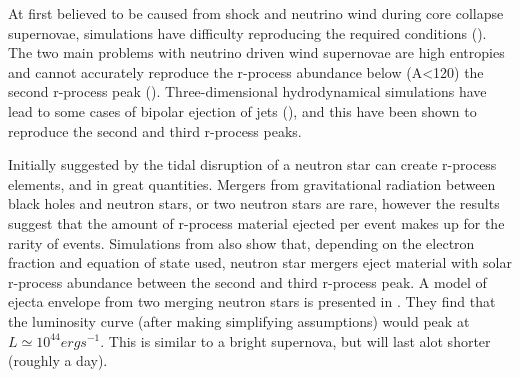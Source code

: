 At first believed to be caused from shock and neutrino wind during core collapse supernovae, simulations have difficulty reproducing the required conditions ().
The two main problems with neutrino driven wind supernovae are high entropies and cannot accurately reproduce the r-process abundance below (A<120) the second r-process peak ().
Three-dimensional hydrodynamical simulations have lead to some cases of bipolar ejection of jets (), and this have been shown to reproduce the second and third r-process peaks.

Initially suggested by  the tidal disruption of a neutron star can create r-process elements, and in great quantities.
Mergers from gravitational radiation between black holes and neutron stars, or two neutron stars are rare, however the results  suggest that the amount of r-process material ejected per event makes up for the rarity of events.
Simulations from  also show that, depending on the electron fraction and equation of state used, neutron star mergers eject material with solar r-process abundance between the second and third r-process peak.
A model of ejecta envelope from two merging neutron stars is presented in .
They find that the luminosity curve (after making simplifying assumptions) would peak at $L \simeq 10^{44} erg s^{-1}$.
This is similar to a bright supernova, but will last alot shorter (roughly a day).
